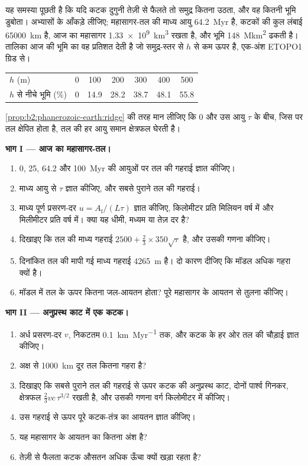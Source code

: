 \begin{problem}\label{pb:b2:phanerozoic-earth:1}
यह समस्या पूछती है कि यदि कटक दुगुनी तेज़ी से फैलते तो समुद्र कितना उठता, और वह कितनी भूमि
डुबोता। अभ्यासों के आँकड़े लीजिए; महासागर-तल की माध्य आयु
\qty{64.2}{Myr} है, कटकों की कुल लंबाई \qty{65000}{km} है, आज का महासागर
\qty{1.33e9}{km^3} रखता है, और भूमि \qty{148}{\mega km^2} ढकती है। तालिका आज की भूमि का वह प्रतिशत देती है
जो समुद्र-स्तर से $h$ से कम ऊपर है, एक-अंश ETOPO1 ग्रिड से।
\begin{center}
\small
\begin{tabular}{lcccccc}
\hline
$h$ (\unit{m}) & 0 & 100 & 200 & 300 & 400 & 500 \\
$h$ से नीचे भूमि (\unit{\percent}) & 0 & 14.9 & 28.2 & 38.7 & 48.1 & 55.8 \\
\hline
\end{tabular}
\end{center}
\cref{prop:b2:phanerozoic-earth:ridge} की तरह मान लीजिए कि 0 और उस
आयु $\tau$ के बीच, जिस पर तल क्षेपित होता है, तल की हर आयु समान क्षेत्रफल घेरती है।

\noindent\textbf{भाग I --- आज का महासागर-तल।}
\begin{enumerate}
  \item 0, 25, 64.2 और \qty{100}{Myr} की आयुओं पर तल की गहराई ज्ञात कीजिए।
  \item माध्य आयु से $\tau$ ज्ञात कीजिए, और सबसे पुराने तल की गहराई।
  \item माध्य पूर्ण प्रसरण-दर $u = A_{\text{f}}/(L\tau)$ ज्ञात कीजिए, किलोमीटर प्रति मिलियन
        वर्ष में और मिलीमीटर प्रति वर्ष में। क्या यह धीमी, मध्यम या तेज़ दर है?
  \item दिखाइए कि तल की माध्य गहराई $2500 + \tfrac23 \times 350\sqrt\tau$ है, और
        उसकी गणना कीजिए।
  \item दिनांकित तल की मापी गई माध्य गहराई \qty{4265}{m} है। दो कारण दीजिए कि
        मॉडल अधिक गहरा क्यों है।
  \item मॉडल में तल के ऊपर कितना जल-आयतन होता? पूरे महासागर के आयतन से
        तुलना कीजिए।
\end{enumerate}

\noindent\textbf{भाग II --- अनुप्रस्थ काट में एक कटक।}
\begin{enumerate}[resume]
  \item अर्ध प्रसरण-दर $v$, निकटतम \qty{0.1}{km.Myr^{-1}} तक, और कटक के हर ओर
        तल की चौड़ाई ज्ञात कीजिए।
  \item अक्ष से \qty{1000}{km} दूर तल कितना गहरा है?
  \item दिखाइए कि सबसे पुराने तल की गहराई से ऊपर कटक की अनुप्रस्थ काट, दोनों
        पार्श्व गिनकर, क्षेत्रफल $\tfrac23 v c\,\tau^{3/2}$ रखती है, और उसकी गणना
        वर्ग किलोमीटर में कीजिए।
  \item उस गहराई से ऊपर पूरे कटक-तंत्र का आयतन ज्ञात कीजिए।
  \item यह महासागर के आयतन का कितना अंश है?
  \item तेज़ी से फैलता कटक औसतन अधिक ऊँचा क्यों खड़ा रहता है?
\end{enumerate}


\end{problem}
